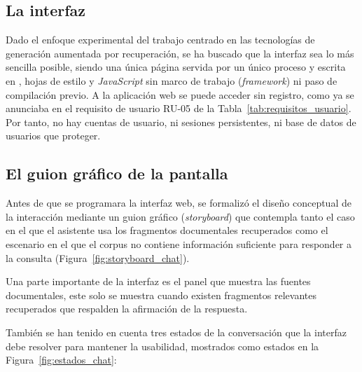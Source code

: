 \subsection[La interfaz]{La interfaz}
\label{secc:fase3_interfaz}

Dado el enfoque experimental del trabajo centrado en las tecnologías de generación aumentada por recuperación, se ha buscado que la interfaz sea lo más sencilla posible, siendo una única página servida por un único proceso y escrita en , hojas de estilo y \textit{JavaScript} sin marco de trabajo (\textit{framework}) ni paso de compilación previo. A la aplicación web se puede acceder sin registro, como ya se anunciaba en el requisito de usuario RU-05 de la Tabla~\ref{tab:requisitos_usuario}. Por tanto, no hay cuentas de usuario, ni sesiones persistentes, ni base de datos de usuarios que proteger.


\subsection[El guion gráfico de la pantalla]{El guion gráfico de la pantalla}
\label{secc:fase3_storyboard}

Antes de que se programara la interfaz web, se formalizó el diseño conceptual de la interacción mediante un guion gráfico (\textit{storyboard}) que contempla tanto el caso en el que el asistente usa los fragmentos documentales recuperados como el escenario en el que el corpus no contiene información suficiente para responder a la consulta (Figura~\ref{fig:storyboard_chat}).



Una parte importante de la interfaz es el panel que muestra las fuentes documentales, este solo se muestra cuando existen fragmentos relevantes recuperados que respalden la afirmación de la respuesta.

También se han tenido en cuenta tres estados de la conversación que la interfaz debe resolver para mantener la usabilidad, mostrados como estados en la Figura~\ref{fig:estados_chat}:

